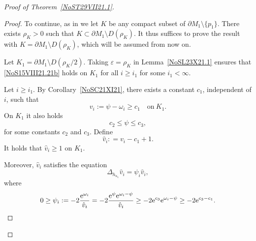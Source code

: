\documentclass[pdftex]{sigma}
\numberwithin{equation}{section}
\newcommand{\repsilon}{ {\varepsilon}}
\newcommand{\red}[1]{{\color{red}#1}}
\newcommand{\mv}{\omega}%
\renewcommand{\red}[1]{#1}
\begin{document}
\begin{proof}[Proof of Theorem~\ref{NoST29VII21.1}]
\begin{proof}
To continue, as in \cite{CDW} we let $K$ be any compact subset of $\partial M_1\setminus \{p_1\}$. There exists $\rho_K>0$ such that $K\subset \partial M_1\setminus D(\rho_K)$. It thus suffices to prove the result with $ K=\partial M_1\setminus D(\rho_K)$, which will be assumed from now on.

Let $K_1 = \partial M_1\setminus D(\rho_K/2)$. Taking $\repsilon=\rho_K $ in Lemma~\ref{NoSL23X21.1} ensures that \eqref{NoS15VIII21.21b} holds on $K_1$ for all $i\ge i_1 $ for some $i_1<\infty$.

Let $i\ge i_1$. By Corollary~\ref{NoSC21XI21},
there exists a constant $c_1$, independent of $i$, such that
\begin{equation*}%
\red{v_i}:=\psi -\mv_i \ge c_1 \quad \text{on} \ K_1.
\end{equation*}
On $K_1$ it also holds
\begin{equation}\label{NoS24X21.1b}
 c_2 \le \psi \le c_3,
\end{equation}
for some constants $c_2$ and $c_3$.
Define
\[
 \red{\hat v_i} : = \red{v_i} -c_1 +1.
\]
It holds that $\red{\hat v_i} \ge 1$ on $K_1$.

Moreover, $\red{\hat v_i}$ satisfies the equation
\begin{equation*}%
 \Delta_{ h_{\kappa_1}} \red{\hat v_i} = \red{\psi_i}\red{\hat v_i},
\end{equation*}
where
\begin{equation*}%
0 \ge \red{\psi_i} : =- 2 \frac{{\rm e}^{\mv_i}}{ \red{\hat v_i}}
 =- 2 \frac{{\rm e}^\psi {\rm e}^{\mv_i-\psi }}{ \red{\hat v_i}}
\ge - 2 {\rm e}^{c_3} {\rm e}^{\mv_i-\psi }
 \ge -2 {\rm e}^{c_3-c_1}.
\end{equation*}


\end{proof}
\end{proof}
\end{document}
